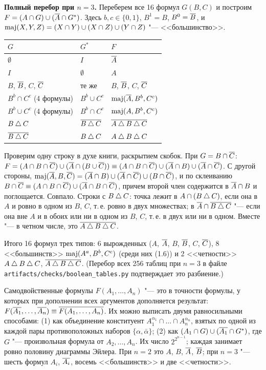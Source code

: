 \begin{solution}[2 (\S\,3)]
\textbf{Полный перебор при $n=3$.} Переберем все 16 формул $G(B,C)$ и
построим $F=(A\cap G)\cup(\overline{A}\cap G^*)$. Здесь $b,c\in\{0,1\}$,
$B^1=B$, $B^0=\overline{B}$, и
$\operatorname{maj}(X,Y,Z)=(X\cap Y)\cup(X\cap Z)\cup(Y\cap Z)$ "--- <<большинство>>.
\begin{center}\small
\begin{tabular}{@{}lll@{}}
\toprule
$G$ & $G^*$ & $F$\\ \midrule
$\emptyset$ & $I$ & $\overline{A}$\\
$I$ & $\emptyset$ & $A$\\
$B$, $\overline{B}$, $C$, $\overline{C}$ & те же & $B$, $\overline{B}$, $C$, $\overline{C}$\\
$B^b\cap C^c$ (4 формулы) & $B^b\cup C^c$ & $\operatorname{maj}(\overline{A},B^b,C^c)$\\
$B^b\cup C^c$ (4 формулы) & $B^b\cap C^c$ & $\operatorname{maj}(A,B^b,C^c)$\\
$B\mathbin{\triangle} C$ & $\overline{B\mathbin{\triangle} C}$ & $\overline{A\mathbin{\triangle} B\mathbin{\triangle} C}$\\
$\overline{B\mathbin{\triangle} C}$ & $B\mathbin{\triangle} C$ & $A\mathbin{\triangle} B\mathbin{\triangle} C$\\
\bottomrule
\end{tabular}
\end{center}
Проверим одну строку в духе книги, раскрытием скобок. При $G=B\cap\overline{C}$:
$F=(A\cap B\cap\overline{C})\cup(\overline{A}\cap(B\cup\overline{C}))\equiv
(A\cap B\cap\overline{C})\cup(\overline{A}\cap B)\cup(\overline{A}\cap\overline{C})$. С другой стороны,
$\operatorname{maj}(\overline{A},B,\overline{C})=(\overline{A}\cap B)\cup(\overline{A}\cap\overline{C})\cup(B\cap\overline{C})$, и
по склеиванию $B\cap\overline{C}\equiv(A\cap B\cap\overline{C})\cup(\overline{A}\cap B\cap\overline{C})$,
причем второй член содержится в $\overline{A}\cap B$ и поглощается. Совпало.
Строки с $B\mathbin{\triangle} C$: точка лежит в $A\cap(B\mathbin{\triangle} C)$, если она в $A$ и ровно в
одном из $B$, $C$, т.\,е. ровно в двух множествах; в $\overline{A}\cap\overline{B\mathbin{\triangle} C}$
"--- если она вне $A$ и в обоих или ни в одном из $B$, $C$, т.\,е. в двух
или ни в одном. Вместе "--- в четном числе, это $\overline{A\mathbin{\triangle} B\mathbin{\triangle} C}$.

Итого 16 формул трех типов: 6 вырожденных ($A$, $\overline{A}$, $B$, $\overline{B}$, $C$,
$\overline{C}$), 8 <<большинств>> $\operatorname{maj}(A^a,B^b,C^c)$ (среди них (1.6)) и
2 <<четности>> $A\mathbin{\triangle} B\mathbin{\triangle} C$, $\overline{A\mathbin{\triangle} B\mathbin{\triangle} C}$. (Перебор всех 256 таблиц
при $n=3$ в файле \texttt{artifacts/checks/boolean\_tables.py} подтверждает
это разбиение.)

\answer Самодвойственные формулы $F(A_1,\dots,A_n)$ "--- это в точности
формулы, у которых при дополнении всех аргументов дополняется результат:
$F(\overline{A_1},\dots,\overline{A_n})\equiv\overline{F(A_1,\dots,A_n)}$. Их можно выписать
двумя равносильными способами: (1) как объединение конституент
$A_1^{\alpha_1}\cap\dots\cap A_n^{\alpha_n}$, взятых по одной из каждой пары
противоположных наборов $\{\alpha,\bar\alpha\}$; (2) как
$(A_1\cap G)\cup(\overline{A_1}\cap G^*)$, где $G$ "--- произвольная формула от
$A_2,\dots,A_n$. Их число $2^{2^{n-1}}$; каждая занимает ровно половину
диаграммы Эйлера. При $n=2$ это $A$, $B$, $\overline{A}$, $\overline{B}$; при $n=3$ "---
шесть формул $A_i$, $\overline{A_i}$, восемь <<большинств>> и две <<четности>>.
\end{solution}

